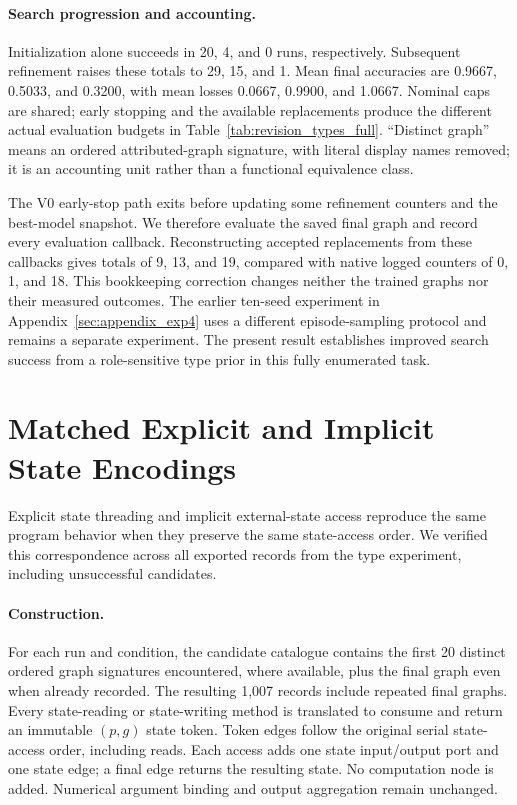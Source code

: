 \paragraph{Search progression and accounting.}
Initialization alone succeeds in 20, 4, and 0 runs, respectively. Subsequent
refinement raises these totals to 29, 15, and 1. Mean final accuracies are
0.9667, 0.5033, and 0.3200, with mean losses 0.0667, 0.9900, and 1.0667.
Nominal caps are shared; early stopping and the available replacements produce
the different actual evaluation budgets in Table~\ref{tab:revision_types_full}.
``Distinct graph'' means an ordered attributed-graph signature, with literal
display names removed; it is an accounting unit rather than a functional
equivalence class.

The V0 early-stop path exits before updating some refinement counters and the
best-model snapshot. We therefore evaluate the saved final graph and record
every evaluation callback. Reconstructing accepted replacements from these
callbacks gives totals of 9, 13, and 19, compared with native logged counters
of 0, 1, and 18. This bookkeeping correction changes neither the trained graphs
nor their measured outcomes. The earlier ten-seed experiment in
Appendix~\ref{sec:appendix_exp4} uses a different episode-sampling protocol and
remains a separate experiment. The present result establishes improved search
success from a role-sensitive type prior in this fully enumerated task.

\section{Matched Explicit and Implicit State Encodings}
\label{app:revision_encoding}

Explicit state threading and implicit external-state access reproduce the same
program behavior when they preserve the same state-access order. We verified
this correspondence across all exported records from the type experiment,
including unsuccessful candidates.

\paragraph{Construction.}
For each run and condition, the candidate catalogue contains the first 20
distinct ordered graph signatures encountered, where available, plus the final
graph even when already recorded. The resulting 1,007 records include repeated
final graphs. Every state-reading or state-writing method is translated to
consume and return an immutable $(p,g)$ state token. Token edges follow the
original serial state-access order, including reads. Each access adds one state
input/output port and one state edge; a final edge returns the resulting state.
No computation node is added. Numerical argument binding and output aggregation
remain unchanged.

